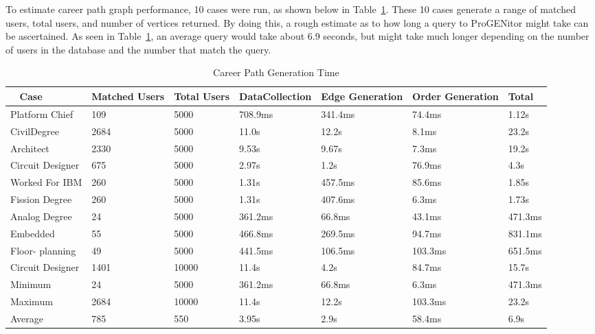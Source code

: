 To estimate career path graph performance, 10 cases were run, as shown below in
Table~\ref{table:career performance}.  These 10 cases generate a range of
matched users, total users, and number of vertices returned.  By doing this, a
rough estimate as to how long a query to ProGENitor might take can be ascertained.  As
seen in Table~\ref{table:career performance}, an average query would take about
6.9 seconds, but might take much longer depending on the number of users in the
database and the number that match the query.

\begin{table}[H]
  \centering
  \begin{tabular}{|p{17mm}|p{16mm}|p{10mm}|p{18mm}|p{19mm}|p{20mm}|p{14mm}|}
  \hline
  \
  Case&Matched Users&Total Users&Data\newline Collection&Edge\newline
  Generation&Order Generation&Total\\
  \hline\hline
  Platform Chief&109&5000&708.9ms&341.4ms&74.4ms&1.12s\\ \hline
  Civil\newline Degree&2684&5000&11.0s&12.2s&8.1ms&23.2s\\ \hline 
  Architect&2330&5000&9.53s&9.67s&7.3ms&19.2s\\ \hline
  Circuit Designer&675&5000&2.97s&1.2s&76.9ms&4.3s\\ \hline
  Worked For IBM&260&5000&1.31s&457.5ms&85.6ms&1.85s\\ \hline
  Fission Degree&260&5000&1.31s&407.6ms&6.3ms&1.73s\\ \hline
  Analog Degree&24&5000&361.2ms&66.8ms&43.1ms&471.3ms\\ \hline
  Embedded&55&5000&466.8ms&269.5ms&94.7ms&831.1ms\\ \hline
  Floor- \newline planning&49&5000&441.5ms&106.5ms&103.3ms&651.5ms\\ \hline
  Circuit Designer&1401&10000&11.4s&4.2s&84.7ms&15.7s\\ \hline
  \hline\hline
  Minimum&24&5000&361.2ms&66.8ms&6.3ms&471.3ms\\ \hline
  Maximum&2684&10000&11.4s&12.2s&103.3ms&23.2s\\ \hline
  Average&785&550&3.95s&2.9s&58.4ms&6.9s\\ \hline
  \end{tabular}
  \caption{Career Path Generation Time}
  \label{table:career performance}
\end{table}

